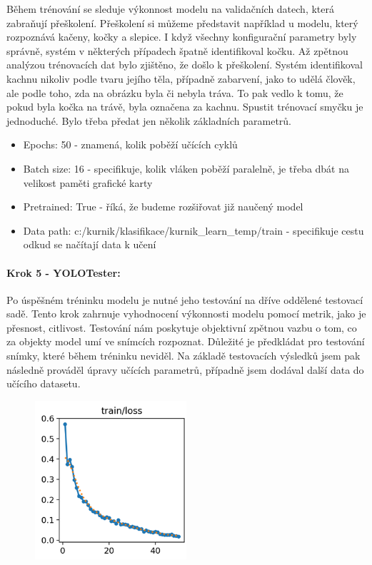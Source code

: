 Během trénování se sleduje výkonnost modelu na validačních datech, která zabraňují přeškolení.
Přeškolení si můžeme představit například u modelu, který rozpoznává kačeny, kočky a slepice.
I když všechny konfigurační parametry byly správně,  systém v některých případech špatně identifikoval kočku.
Až zpětnou analýzou trénovacích dat bylo zjištěno, že došlo k přeškolení.
Systém identifikoval kachnu nikoliv podle tvaru jejího těla, případně zabarvení, jako to udělá člověk, ale podle toho, zda na obrázku byla či nebyla tráva.
To pak vedlo k tomu, že pokud byla kočka na trávě, byla označena za kachnu.
Spustit trénovací smyčku je jednoduché.
Bylo třeba předat jen několik základních parametrů.


\begin{itemize}
    \item Epochs: 50 - znamená, kolik poběží učících cyklů
    \item Batch size: 16 - specifikuje, kolik vláken poběží paralelně, je třeba dbát na velikost paměti grafické karty
    \item Pretrained: True - říká, že budeme rozšiřovat již naučený model
    \item Data path: c:/kurnik/klasifikace/kurnik\_learn\_temp/train - specifikuje cestu odkud se načítají data k učení
\end{itemize}

\paragraph*{Krok 5 - YOLOTester:}

Po úspěšném tréninku modelu je nutné jeho testování na dříve oddělené testovací sadě.
Tento krok zahrnuje vyhodnocení výkonnosti modelu pomocí metrik, jako je přesnost, citlivost.
Testování nám poskytuje objektivní zpětnou vazbu o tom, co za objekty model umí ve snímcích rozpoznat.
Důležité je předkládat pro testování snímky, které během tréninku neviděl.
Na základě testovacích výsledků jsem pak následně prováděl úpravy učících parametrů, případně jsem dodával další data do učícího datasetu.

\begin{figure}[htbp]
    \centering
    \includegraphics[width=0.5\textwidth]{img/loss_funkce}
    \label{fig:loss_funkce}
\end{figure}

